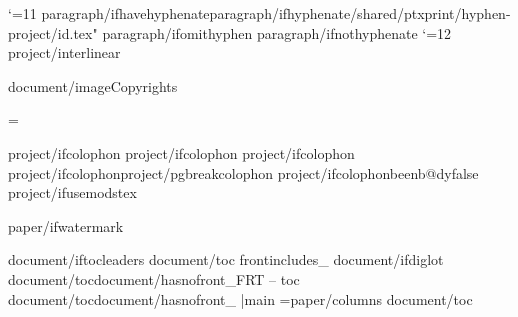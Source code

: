 \def\b{{\the\p@rstylehooks \par\bgroup\s@tbaseline{{b}}\vskip\baselineskip\egroup}}
\newlanguage\langund \language\langund
\catcode`\@=11
{paragraph/ifhavehyphenate}{paragraph/ifhyphenate}\bgroup{}/shared/ptxprint/hyphen-{project/id}.tex" \egroup
{paragraph/ifomithyphen} %
{paragraph/ifnothyphenate} 
\catcode`\@=12
\let\pb=\pagebreak
{project/interlinear}\expandafter\def\csname complex-rb\endcsname{{}}




\def\addInt{{{project/intfile}}}


{document/imageCopyrights}

\exhyphenpenalty=\hyphenpenalty

{project/ifcolophon}\expandafter\def\csname bookend-final\endcsname{{
{project/ifcolophon}\layoutstylebreak
{project/ifcolophon}\singlecolumn
{project/ifcolophon}{project/pgbreakcolophon}\pb
{project/ifcolophon}\zcolophon\csname beenb@dyfalse\endcsname}}
{project/ifusemodstex}%



{paper/ifwatermark}\def\MergePDF{{"{paper/watermarkpdf}"}}


\NoBodytrue
{document/iftocleaders}
{document/toc}
{frontincludes_}
{document/ifdiglot}\diglotfalse
\StoreAllPeriphstrue\addInt\StoreAllPeriphsfalse
{}
{document/toc}{document/hasnofront_}\preptxfile\prepusfm\id FRT -- toc
{document/toc}{document/hasnofront_} \ip \ztoc |main\*\ip \postptxfile
\BodyColumns={paper/columns}     %
{document/toc}
\NoBodyfalse

